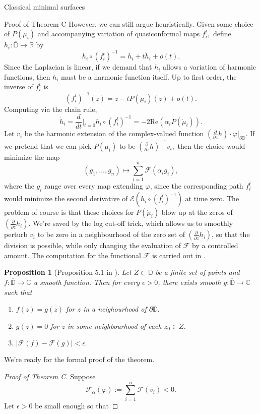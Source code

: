 \documentclass[10pt]{amsart}
\newcommand{\R}{\mathbb R}
\newtheorem{prop}[thm]{Proposition}
\theoremstyle{definition}
\begin{document}
\begin{section}{Classical minimal surfaces}
\begin{subsection}{Proof of Theorem C}
However, we can still argue heuristically. Given some choice of $P(\dot{\mu}_i)$ and accompanying variation of quasiconformal maps $f_i^t,$ define $\dot{h}_i:\overline{\mathbb{D}}\to\R$ by $$h_i\circ (f_i^t)^{-1}=h_i+t\dot{h}_i+o(t).$$ Since the Laplacian is linear, if we demand that $\dot{h}_i$ allows a variation of harmonic functions, then $\dot{h}_i$ must be a harmonic function itself. Up to first order, the inverse of $f_i^t$ is $$(f_i^t)^{-1}(z)=z-tP(\dot{\mu}_i)(z) + o(t).$$ Computing via the chain rule, $$\dot{h}_i = \frac{d}{dt}|_{t=0}h_i\circ (f_i^t)^{-1}= -2\textrm{Re}(\alpha_i P(\dot{\mu}_i)).$$ Let $v_i$ be the harmonic extension of the complex-valued function $(\frac{\partial}{\partial z} h)\cdot \varphi|_{\partial\mathbb{D}}$.  If we pretend that we can pick $P(\dot{\mu}_i)$ to be $(\frac{\partial}{\partial z} h)^{-1}v_i,$ then the choice would minimize the map $$(g_1,\dots, g_n)\mapsto\sum_{i=1}^n\mathcal{F}(\alpha_i g_i),$$ where the $g_i$ range over every map extending $\varphi$, since the corresponding path $f_i^t$ would minimize the second derivative of $\mathcal{E}(h_i\circ (f_i^t)^{-1})$ at time zero. The problem of course is that these choices for $P(\dot{\mu}_i)$ blow up at the zeros of $(\frac{\partial}{\partial z} h_i)$. We're saved by the log cut-off trick, which allows us to smoothly perturb $v_i$ to be zero in a neighbourhood of the zero set of $(\frac{\partial}{\partial z} h_i)$, so that the division is possible, while only changing the evaluation of $\mathcal{F}$ by a controlled amount. The computation for the functional $\mathcal{F}$ is carried out in \cite[Section 5]{M2}.
\begin{prop}[Proposition 5.1 in \cite{M2}]\label{mar}
Let $Z\subset \mathbb{D}$ be a finite set of points and $f:\overline{\mathbb{D}}\to\mathbb{C}$ a smooth function. Then for every $\epsilon>0$, there exists smooth $g:\overline{\mathbb{D}}\to\mathbb{C}$ such that 
\begin{enumerate}
    \item $f(z)=g(z)$ for $z$ in a neighourhood of $\partial\mathbb{D}.$
    \item $g(z)=0$ for $z$ in some neighbourhood of each $z_0\in Z$.
    \item $|\mathcal{F}(f)-\mathcal{F}(g)|<\epsilon.$
\end{enumerate}
\end{prop}
We're ready for the formal proof of the theorem.
\begin{proof}[Proof of Theorem C]
Suppose $$\mathcal{F}_{\alpha}(\varphi) := \sum_{i=1}^n \mathcal{F}(v_i)<0.$$ Let $\epsilon>0$ be small enough so that 

\end{proof}
\end{subsection}
\end{section}
\end{document}
